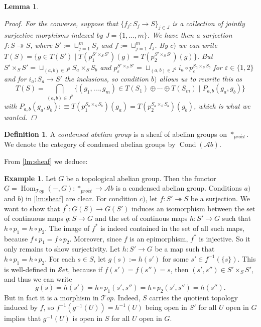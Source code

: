 \documentclass[11pt,A4]{article}
\theoremstyle{plain}
\newtheorem{lm}[thm]{Lemma}
\theoremstyle{definition}
\newtheorem{defn}[thm]{Definition}
\newtheorem{exa}[thm]{Example}
\theoremstyle{remark}
\newcommand{\Top}{\mathscr{T}op}
\newcommand{\Ab}{\mathscr{A}b}
\newcommand{\Set}{\mathscr{S}et}
\DeclareMathOperator{\Hom}{Hom}
\DeclareMathOperator{\Cond}{Cond}
\newcommand{\pe}{*_{pro\acute et}}
\renewcommand{\u}[1]{\underline{#1}}
\newcommand{\op}{\oplus}
\newcommand{\fp}[1]{\times_{#1}}
\begin{document}
\begin{lm}
\begin{proof}
	For the converse, suppose that $\{f_{j}\colon S_{j}\to S\}_{j\in J}$ is a collection of jointly surjective morphisms indexed by $J=\{ 1,\ldots,m\}$.
	We have then a surjection $f\colon S \twoheadrightarrow S$, where $S':=\sqcup_{j=1}^{m}S_{j}$ and $f:=\sqcup_{j=1}^{m}f_{j}$.
	By $c)$ we can write $T(S)=\{ g\in T(S')\mid T(p_{1}^{S'\fp{S}S'})(g)=T(p_{2}^{S'\fp{S}S'})(g)\}$.
	But $S'\fp{S}S'=\sqcup_{(a,b)\in J^{2}} S_{a}\fp{S}S_{b}$ and $p_{\varepsilon }^{S'\fp{S}S'}=\sqcup_{(a,b)\in J^{2}} i_{a}\circ p_{\varepsilon }^{S_{a}\fp{S}S_{b}}$ for $\varepsilon \in \{1,2\}$ and for $i_{a}\colon S_{a}\to S'$ the inclusions, so condition $b)$ allows us to rewrite this as
	\[ T(S)=\bigcap_{(a,b)\in J^{2}} \{ (g_{1},\ldots,g_{m})\in T(S_{1})\op \cdots \op T(S_{m})\mid P_{a,b}(g_{a},g_{b})\}\]
	with $P_{a,b}(g_{a},g_{b}):\equiv T(p_{1}^{S_{a}\fp{S}S_{b}})(g_{a})=T(p_{2}^{S_{a}\fp{S}S_{b}})(g_{b})$, which is what we wanted.	
    \end{proof}
\end{lm}

\begin{defn}
    A \textit{condensed abelian group} is a sheaf of abelian groups on $\pe$.
    We denote the category of condensed abelian groups by $\Cond(\Ab)$.
\end{defn}

From \cref{lm:sheaf} we deduce:

\begin{exa}
    Let $G$ be a topological abelian group. Then the functor $\u{G}=\Hom_{\Top}(-,G)\colon \pe\to \Ab$ is a condensed abelian group.
    Conditions $a)$ and $b)$ in \cref{lm:sheaf} are clear.
    For condition $c)$, let $f\colon S'\twoheadrightarrow S$ be a surjection.
    We want to show that $f^{*}\colon \u{G}(S)\to \u{G}(S')$ induces an isomorphism between the set of continuous maps $g\colon S\to G$ and the set of continous maps $h\colon S'\to G$ such that $h\circ p_{1}=h\circ p_{2}$.
    The image of $f^{*}$ is indeed contained in the set of all such maps, because $f\circ p_{1}=f\circ p_{2}$.
    Moreover, since $f$ is an epimorphism, $f^{*}$ is injective.
    So it only remains to show surjectivity.
    Let $h\colon S'\to G$ be a map such that $h\circ p_{1}=h\circ p_{2}$.
    For each $s\in S$, let $g(s):=h(s')$ for some $s'\in f^{-1}(\{s\})$.
    This is well-defined in $\Set$, because if $f(s')=f(s'')=s$, then $(s',s'')\in S'\times_{S}S'$, and thus we can write
    \[ g(s)=h(s')=h\circ p_{1}(s',s'')=h\circ p_{2}(s',s'')=h(s'').\]
    But in fact it is a morphism in $\Top$.
    Indeed, $S$ carries the quotient topology induced by $f$, so $f^{-1}(g^{-1}(U))=h^{-1}(U)$ being open in $S'$ for all $U$ open in $G$ implies that $g^{-1}(U)$ is open in $S$ for all $U$ open in $G$.
\end{exa}
\end{document}
